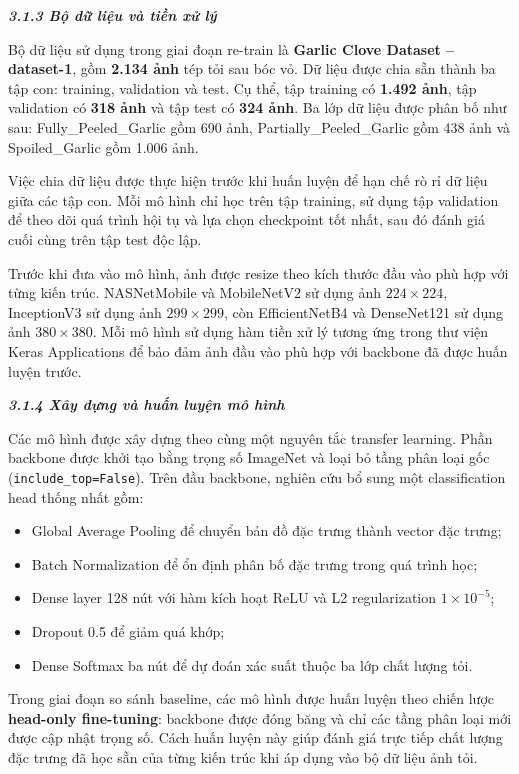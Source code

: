 \documentclass[
]{article}
\begin{document}
\protect{}\label{_bookmark21}{}\emph{\textbf{3.1.3 Bộ dữ
liệu và tiền xử lý}}

Bộ dữ liệu sử dụng trong giai đoạn re-train là
\textbf{Garlic Clove Dataset -- dataset-1}, gồm \textbf{2.134 ảnh} tép
tỏi sau bóc vỏ. Dữ liệu được chia sẵn thành ba tập con: training,
validation và test. Cụ thể, tập training có \textbf{1.492 ảnh}, tập
validation có \textbf{318 ảnh} và tập test có \textbf{324 ảnh}. Ba lớp dữ
liệu được phân bố như sau: Fully\_Peeled\_Garlic gồm 690 ảnh,
Partially\_Peeled\_Garlic gồm 438 ảnh và Spoiled\_Garlic gồm 1.006 ảnh.

Việc chia dữ liệu được thực hiện trước khi huấn luyện để hạn chế rò rỉ dữ
liệu giữa các tập con. Mỗi mô hình chỉ học trên tập training, sử dụng tập
validation để theo dõi quá trình hội tụ và lựa chọn checkpoint tốt nhất,
sau đó đánh giá cuối cùng trên tập test độc lập.

Trước khi đưa vào mô hình, ảnh được resize theo kích thước đầu vào phù
hợp với từng kiến trúc. NASNetMobile và MobileNetV2 sử dụng ảnh
\(224 \times 224\), InceptionV3 sử dụng ảnh \(299 \times 299\), còn
EfficientNetB4 và DenseNet121 sử dụng ảnh \(380 \times 380\). Mỗi mô hình
sử dụng hàm tiền xử lý tương ứng trong thư viện Keras Applications để bảo
đảm ảnh đầu vào phù hợp với backbone đã được huấn luyện trước.

\protect{}\label{_Toc232112029}{}\emph{\textbf{3.1.4 Xây
dựng và huấn luyện mô hình}}

Các mô hình được xây dựng theo cùng một nguyên tắc transfer learning.
Phần backbone được khởi tạo bằng trọng số ImageNet và loại bỏ tầng phân
loại gốc (\texttt{include\_top=False}). Trên đầu backbone, nghiên cứu bổ
sung một classification head thống nhất gồm:

\begin{itemize}
\item
  Global Average Pooling để chuyển bản đồ đặc trưng thành vector đặc
  trưng;
\item
  Batch Normalization để ổn định phân bố đặc trưng trong quá trình học;
\item
  Dense layer 128 nút với hàm kích hoạt ReLU và L2 regularization
  \(1\times10^{-5}\);
\item
  Dropout 0.5 để giảm quá khớp;
\item
  Dense Softmax ba nút để dự đoán xác suất thuộc ba lớp chất lượng tỏi.
\end{itemize}

Trong giai đoạn so sánh baseline, các mô hình được huấn luyện theo chiến
lược \textbf{head-only fine-tuning}: backbone được đóng băng và chỉ các
tầng phân loại mới được cập nhật trọng số. Cách huấn luyện này giúp đánh
giá trực tiếp chất lượng đặc trưng đã học sẵn của từng kiến trúc khi áp
dụng vào bộ dữ liệu ảnh tỏi.
\end{document}
